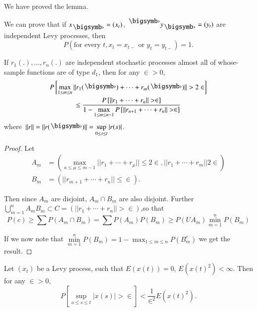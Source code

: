 We have proved the lemma.
\begin{remark*}
  We can prove  that if $x_{\bigdot} = (x_t)$,
  ${}^{\bigdot}y_{\bigdot}= (y_t)$ are independent Levy processes,
  then   
  $$
  P(\text{for every } t, x_t =x_{t-} \text{\ or\ } y_t = y_{t-}) =1.
  $$
\end{remark*}

\begin{Lemma}[Ottaviani]\label{chap4-sec3-lem2} %
  If $r_1 (.) , \ldots , r_n (.)$ are
  independent stochastic processes almost all of whose-sample
  functions are of type $d_1$, then for any $\in > 0$, 
  \begin{gather*}
  P \left[\max_{1 \leq m \leq n} ||  r_1 (\bigdot)  +  \cdots + r_m
    (\bigdot) || > 2 
    \in \right]\\
 \leq \frac{P\left[ || r_1 +  \cdots +  r_n ||> \in
      \right]}{1- \max\limits_{1 \leq m \leq n-1} P \left[ ||  r_{n+1}
      +  \cdots + r_n || > \in \right]}
  \end{gather*}
where\ $||  r ||  = || r(\bigdot) ||  = \sup\limits_{0 \le s
    \le t} | r (s) |$.
\end{Lemma}


\begin{proof}
Let
\begin{align*}
    A_m & = \left( \max_{a \le \mu \le m-1} || r_1 + \cdots + r_\mu ||  \le 2
    \in , ||  r_1 + \cdots +  r_m || 2 \in \right) \\ 
    B_m & = ( || r_{m+1}+  \cdots +r_n ||  \le \in ) . 
\end{align*}

Then since $A_m$ are disjoint, $A_m \cap B_m$ are also
disjoint. Further $\bigcup\limits_{m=1}^n A_m B_m \subset  C =  ( ||
r_1 + \cdots + r_n || > \in )$,\pageoriginale so that  
$$
P(c) \ge \sum P(A_m \cap B_m) = \sum P(A_m) P (B_m) \ge P(U A_m)
\min^n_{m=1} P(B_m) 
$$

If we now note that $\min\limits^{n}_{m=1} P(B_m)=1 - \max_{1 \leq m
  \leq n} P(B^c_m)$ we get the result. 
\end{proof}

\begin{Lemma}\label{chap4-sec3-lem3} %
  Let $(x_t)$ be a Levy process, such that $E(x(t)) =0$, $E(x(t)^2) <
  \infty$. Then for any $\in > 0$, 
  $$
  P \left[ \sup_{o \leq s \leq t} | x(s) | > \in \right] <
  \frac{1}{\in^2} E (x(t)^2). 
  $$
\end{Lemma} 

